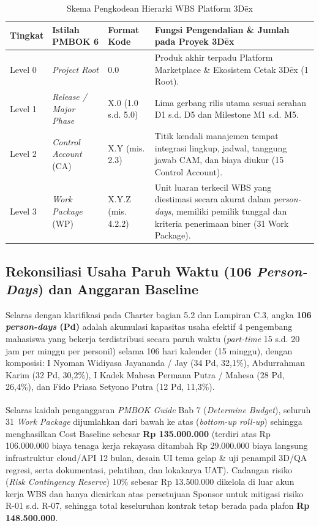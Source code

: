 \documentclass[11pt,a4paper]{article}
\newcommand{\thdr}[1]{\centering\arraybackslash\textbf{#1}}
\renewcommand{\arraystretch}{1.24}
\begin{document}
\begin{table}[H]
\centering
\caption{Skema Pengkodean Hierarki WBS Platform 3D\={e}x}
{\renewcommand{\arraystretch}{1.15}\small
\begin{tabularx}{\textwidth}{| C{1.8cm} | L{3.6cm} | C{2.3cm} | Y |}
\hline
{} \thdr{Tingkat} & \thdr{Istilah PMBOK 6} & \thdr{Format Kode} & \thdr{Fungsi Pengendalian \& Jumlah pada Proyek 3D\={e}x} \\
\hline
Level 0 & \textit{Project Root} & 0.0 & Produk akhir terpadu Platform Marketplace \& Ekosistem Cetak 3D\={e}x (1 Root). \\
\hline
Level 1 & \textit{Release / Major Phase} & X.0 (1.0 s.d. 5.0) & Lima gerbang rilis utama sesuai serahan D1 s.d. D5 dan Milestone M1 s.d. M5. \\
\hline
Level 2 & \textit{Control Account} (CA) & X.Y (mis. 2.3) & Titik kendali manajemen tempat integrasi lingkup, jadwal, tanggung jawab CAM, dan biaya diukur (15 Control Account). \\
\hline
Level 3 & \textit{Work Package} (WP) & X.Y.Z (mis. 4.2.2) & Unit luaran terkecil WBS yang diestimasi secara akurat dalam \textit{person-days}, memiliki pemilik tunggal dan kriteria penerimaan biner (31 Work Package). \\
\hline
\end{tabularx}}
\end{table}

\subsection{Rekonsiliasi Usaha Paruh Waktu (106 \textit{Person-Days}) dan Anggaran Baseline}
Selaras dengan klarifikasi pada Charter bagian 5.2 dan Lampiran C.3, angka \textbf{106 \textit{person-days} (Pd)} adalah akumulasi kapasitas usaha efektif 4 pengembang mahasiswa yang bekerja terdistribusi secara paruh waktu (\textit{part-time} 15 s.d. 20 jam per minggu per personil) selama 106 hari kalender (15 minggu), dengan komposisi: I Nyoman Widiyasa Jayananda / Jay (34 Pd, 32,1\%), Abdurrahman Karim (32 Pd, 30,2\%), I Kadek Mahesa Permana Putra / Mahesa (28 Pd, 26,4\%), dan Fido Priasa Setyono Putra (12 Pd, 11,3\%).

Selaras kaidah penganggaran \textit{PMBOK\textsuperscript{\textregistered} Guide} Bab 7 (\textit{Determine Budget}), seluruh 31 \textit{Work Package} dijumlahkan dari bawah ke atas (\textit{bottom-up roll-up}) sehingga menghasilkan Cost Baseline sebesar \textbf{Rp 135.000.000} (terdiri atas Rp 106.000.000 biaya tenaga kerja rekayasa ditambah Rp 29.000.000 biaya langsung infrastruktur cloud/API 12 bulan, desain UI tema gelap \& uji penampil 3D/QA regresi, serta dokumentasi, pelatihan, dan lokakarya UAT). Cadangan risiko (\textit{Risk Contingency Reserve}) 10\% sebesar Rp 13.500.000 dikelola di luar akun kerja WBS dan hanya dicairkan atas persetujuan Sponsor untuk mitigasi risiko R-01 s.d. R-07, sehingga total keseluruhan kontrak tetap berada pada plafon \textbf{Rp 148.500.000}.
\end{document}
